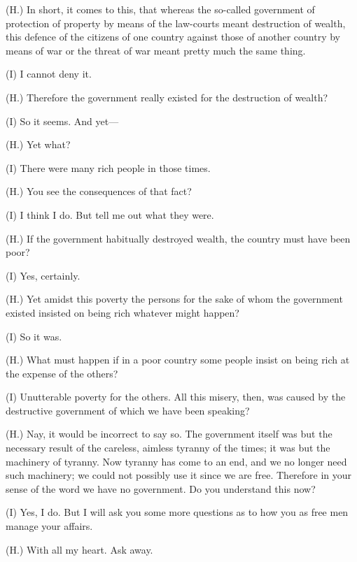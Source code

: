 (H.) In short, it comes to this, that whereas the so-called government
of protection of property by means of the law-courts meant destruction
of wealth, this defence of the citizens of one country against those of
another country by means of war or the threat of war meant pretty much
the same thing.

(I) I cannot deny it.

(H.) Therefore the government really existed for the destruction of
wealth?

(I) So it seems. And yet---

(H.) Yet what?

(I) There were many rich people in those times.

(H.) You see the consequences of that fact?

(I) I think I do. But tell me out what they were.

(H.) If the government habitually destroyed wealth, the country must
have been poor?

(I) Yes, certainly.

(H.) Yet amidst this poverty the persons for the sake of whom the
government existed insisted on being rich whatever might happen?

(I) So it was.

(H.) What must happen if in a poor country some people insist on being
rich at the expense of the others?

(I) Unutterable poverty for the others. All this misery, then, was
caused by the destructive government of which we have been speaking?

(H.) Nay, it would be incorrect to say so. The government itself was but
the necessary result of the careless, aimless tyranny of the times; it
was but the machinery of tyranny. Now tyranny has come to an end, and we
no longer need such machinery; we could not possibly use it since we are
free. Therefore in your sense of the word we have no government. Do you
understand this now?

(I) Yes, I do. But I will ask you some more questions as to how you as
free men manage your affairs.

(H.) With all my heart. Ask away.
